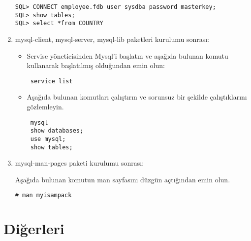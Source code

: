 \documentclass[a4paper,10pt]{article}
\begin{document}
\begin{enumerate}
\begin{verbatim}
SQL> CONNECT employee.fdb user sysdba password masterkey;
SQL> show tables;
SQL> select *from COUNTRY
\end{verbatim}

 \item mysql-client, mysql-server, mysql-lib paketleri kurulumu sonrası:
\begin{itemize}
 \item Servise yöneticisinden Mysql'i başlatın ve  aşağıda bulunan komutu kullanarak başlatılmış olduğundan emin olun:

\begin{verbatim}
 service list
\end{verbatim}
 \item Aşağıda bulunan komutları çalıştırın ve sorunsuz bir şekilde çalıştıklarını gözlemleyin.
\begin{verbatim}
 mysql 
 show databases;
 use mysql;
 show tables;
\end{verbatim}


\end{itemize}

\item mysql-man-pages paketi kurulumu sonrası:

Aşağıda bulunan komutun man sayfasını düzgün açtığından emin olun.
\begin{verbatim}
# man myisampack 
\end{verbatim}

\end{enumerate}

\section{Diğerleri}
\end{document}
